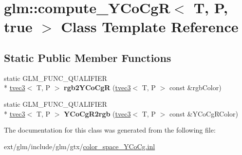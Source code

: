 \hypertarget{classglm_1_1compute___y_co_cg_r_3_01_t_00_01_p_00_01true_01_4}{\section{glm\-:\-:compute\-\_\-\-Y\-Co\-Cg\-R$<$ T, P, true $>$ Class Template Reference}
\label{classglm_1_1compute___y_co_cg_r_3_01_t_00_01_p_00_01true_01_4}
}
\subsection*{Static Public Member Functions}
\begin{DoxyCompactItemize}
\item 
\hypertarget{classglm_1_1compute___y_co_cg_r_3_01_t_00_01_p_00_01true_01_4_a82803505194346c9a8d9d17d770a8c45}{static G\-L\-M\-\_\-\-F\-U\-N\-C\-\_\-\-Q\-U\-A\-L\-I\-F\-I\-E\-R \\*
\hyperlink{structglm_1_1tvec3}{tvec3}$<$ T, P $>$ {\bfseries rgb2\-Y\-Co\-Cg\-R} (\hyperlink{structglm_1_1tvec3}{tvec3}$<$ T, P $>$ const \&rgb\-Color)}\label{classglm_1_1compute___y_co_cg_r_3_01_t_00_01_p_00_01true_01_4_a82803505194346c9a8d9d17d770a8c45}

\item 
\hypertarget{classglm_1_1compute___y_co_cg_r_3_01_t_00_01_p_00_01true_01_4_a06da2d71b6b47d04e9579eef10022cbb}{static G\-L\-M\-\_\-\-F\-U\-N\-C\-\_\-\-Q\-U\-A\-L\-I\-F\-I\-E\-R \\*
\hyperlink{structglm_1_1tvec3}{tvec3}$<$ T, P $>$ {\bfseries Y\-Co\-Cg\-R2rgb} (\hyperlink{structglm_1_1tvec3}{tvec3}$<$ T, P $>$ const \&Y\-Co\-Cg\-R\-Color)}\label{classglm_1_1compute___y_co_cg_r_3_01_t_00_01_p_00_01true_01_4_a06da2d71b6b47d04e9579eef10022cbb}

\end{DoxyCompactItemize}


The documentation for this class was generated from the following file\-:\begin{DoxyCompactItemize}
\item 
ext/glm/include/glm/gtx/\hyperlink{color__space___y_co_cg_8inl}{color\-\_\-space\-\_\-\-Y\-Co\-Cg.\-inl}\end{DoxyCompactItemize}
